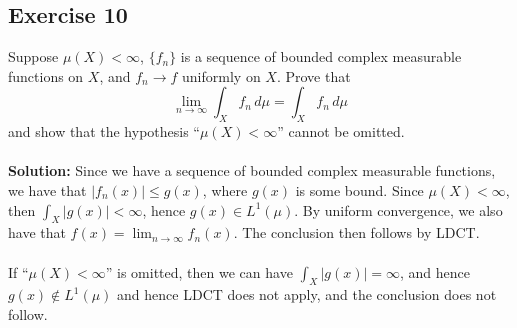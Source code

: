 \documentclass{article}
\begin{document}
\subsection*{Exercise 10}
Suppose $\mu(X)<\infty$, $\{f_n\}$ is a sequence of bounded complex measurable functions on $X$,
and $f_n \to f$ uniformly on $X$. Prove that
\[ \lim_{n\to\infty} \int_X f_n \,d\mu  = \int_X f_n \,d\mu\]
and show that the hypothesis ``$\mu(X) < \infty$'' cannot be omitted.
\\\\
\textbf{Solution:}
Since we have a sequence of bounded complex measurable functions, we have that $|f_n(x)| \le g(x) $, where $g(x)$ is some bound.
Since $\mu(X) < \infty$, then $\int_X |g(x)| < \infty$, hence $g(x) \in L^1(\mu)$.
By uniform convergence, we also have that $f(x) = \lim_{n\to\infty} f_n(x)$. The conclusion then follows by LDCT.
\\\\
If ``$\mu(X) < \infty$'' is omitted, then we can have $\int_X |g(x)| = \infty$, and hence $g(x) \notin L^1(\mu)$ and hence LDCT does not apply,
and the conclusion does not follow.
\end{document}
